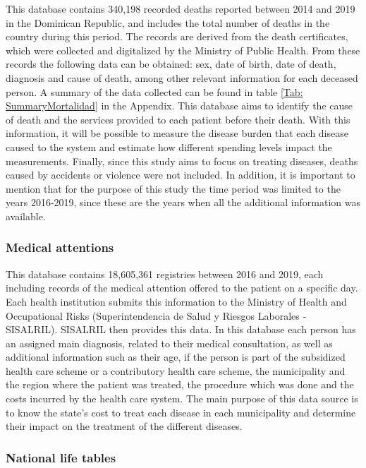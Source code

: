 \documentclass[11pt]{article}
\numberwithin{equation}{section}
\theoremstyle{remark}
\begin{document}
This database contains 340,198 recorded deaths reported between 2014 and 2019 in the Dominican Republic, and includes the total number of deaths in the country during this period. The records are derived from the death certificates, which were collected and digitalized by the Ministry of Public Health. From these records the following data can be obtained: sex, date of birth, date of death, diagnosis and cause of death, among other relevant information for each deceased person. 
A summary of the data collected can be found in table \ref{Tab: SummaryMortalidad} in the Appendix. This database aims to identify the cause of death and the services provided to each patient before their death. With this information, it will be possible to measure the disease burden that each disease caused to the system and estimate how different spending levels impact the measurements. Finally, since this study aims to focus on treating diseases, deaths caused by accidents or violence were not included. In addition, it is important to mention that for the purpose of this study the time period was limited to the years 2016-2019, since these are the years when all the additional information was available.



\subsubsection{Medical attentions}

This database contains 18,605,361 registries between 2016 and 2019, each including records of the medical attention offered to the patient on a specific day. Each health institution submits this information to the Ministry of Health and Occupational Risks (Superintendencia de Salud y Riesgos Laborales - SISALRIL). SISALRIL then provides this data. In this database each person has an assigned main diagnosis, related to their medical consultation, as well as additional information such as their age, if the person is part of the subsidized health care scheme or a contributory health care scheme, the municipality and the region where the patient was treated, the procedure which was done and the costs incurred by the health care system. The main purpose of this data source is to know the state's cost to treat each disease in each municipality and determine their impact on the treatment of the different diseases.\\

\subsubsection{National life tables}
\end{document}
